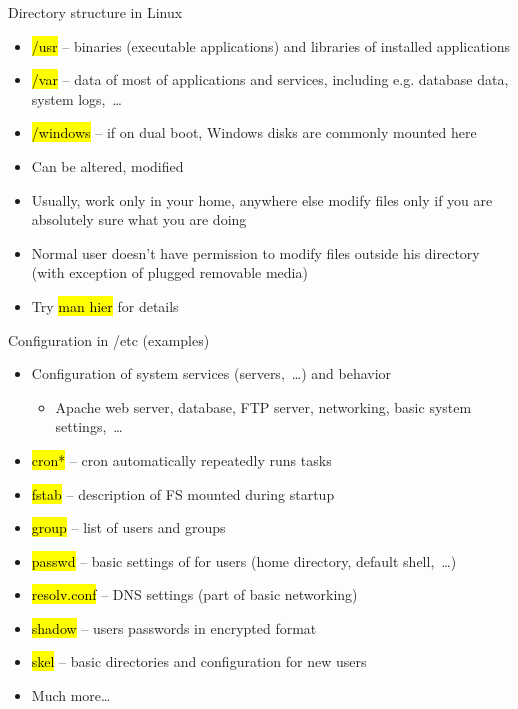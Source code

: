\documentclass[compress, ucs, xelatex, 11pt, xcolor=svgnames,
  hyperref={
    bookmarks=true,
    unicode=true,
    colorlinks=true,
    pdftitle={Linux, command line and MetaCentrum},
    plainpages=false,
    pdfauthor={Vojtech Zeisek},
    pdfsubject={Course about use of Linux command line, writing shell scripts and using MetaCentrum of CESNET},
    pdfcreator={XeLaTeX},
    pdfkeywords={Linux, GNU, BASH, shell, command line, MetaCentrum},
    linkcolor=DarkRed,
    anchorcolor=DarkBlue,
    citecolor=Indigo,
    filecolor=NavyBlue,
    menucolor=DarkMagenta,
    urlcolor=DarkBlue,
    pdftex},
  url={hyphens, lowtilde} %
  ]{beamer}
\renewcommand{\texttt}[1]{\hl{\ttfamily #1}}
\renewcommand{\alert}[1]{\textcolor{red}{#1}}
\begin{document}
\begin{frame}[allowframebreaks]{Directory structure in Linux}
\begin{itemize}
    \item \texttt{/usr} -- binaries (executable applications) and libraries of installed applications
    \item \alert{\texttt{/var}} -- data of most of applications and services, including e.g. database data, system logs,~\ldots
    \item \alert{\texttt{/windows}} -- if on dual boot, Windows disks are commonly mounted here
    \item Can be altered, modified
    \item Usually, work only in your home, anywhere else modify files only if you are absolutely sure what you are doing
    \item Normal user doesn't have permission to modify files outside his directory (with exception of plugged removable media)
    \item Try \texttt{man hier} for details
  \end{itemize}
\end{frame}

\begin{frame}{Configuration in /etc (examples)}
  \begin{itemize}
    \item Configuration of system services (servers,~\ldots) and behavior
    \begin{itemize}
      \item Apache web server, database, FTP server, networking, basic system settings,~\ldots
    \end{itemize}
    \item \texttt{cron*} -- cron automatically repeatedly runs tasks
    \item \texttt{fstab} -- description of FS mounted during startup
    \item \texttt{group} -- list of users and groups
    \item \texttt{passwd} -- basic settings of for users (home directory, default shell,~\ldots)
    \item \texttt{resolv.conf} --  DNS settings (part of basic networking)
    \item \texttt{shadow} -- users passwords in encrypted format
    \item \texttt{skel} -- basic directories and configuration for new users
    \item Much more\ldots
  \end{itemize}
\end{frame}
\end{document}

